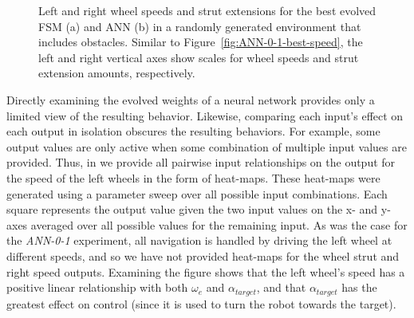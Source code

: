 \begin{figure}[!ht]
    \centering





    \caption{Left and right wheel speeds and strut extensions for the best evolved FSM (a) and ANN (b) in a randomly generated environment that includes obstacles. Similar to Figure~\ref{fig:ANN-0-1-best-speed}, the left and right vertical axes show scales for wheel speeds and strut extension amounts, respectively.}
    \label{fig:40-2-best-speed}


\end{figure}





%
Directly examining the evolved weights of a neural network provides only a limited view of the resulting behavior. Likewise, comparing each input's effect on each output in isolation obscures the resulting behaviors.
%
For example, some output values are only active when some combination of multiple input values are provided.
%
Thus, in  we provide all pairwise input relationships on the output for the speed of the left wheels in the form of heat-maps.
%
These heat-maps were generated using a parameter sweep over all possible input combinations. Each square represents the output value given the two input values on the x- and y-axes averaged over all possible values for the remaining input.
%
%
As was the case for the \emph{ANN-0-1} experiment, all navigation is handled by driving the left wheel at different speeds, and so we have not provided heat-maps for the wheel strut and right speed outputs.
%
Examining the figure shows that the left wheel's speed has a positive linear relationship with both $\omega_e$ and $\alpha_{\mathit{target}}$, and that $\alpha_{\mathit{target}}$ has the greatest effect on control (since it is used to turn the robot towards the target).
%


